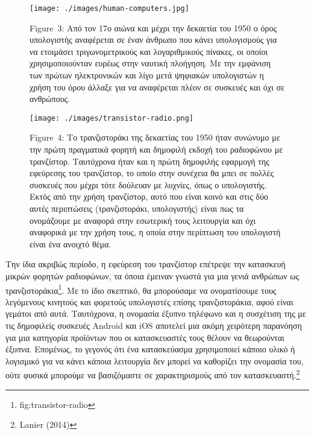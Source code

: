 \documentclass[
]{article}
\begin{document}
\leavevmode{}%
\begin{figure}
\hypertarget{fig:human-computers}{%
\centering
\texttt{[image: ./images/human-computers.jpg]}
\caption{Figure~3: Από τον 17ο αιώνα και μέχρι την δεκαετία του 1950 ο
όρος υπολογιστής αναφέρεται σε έναν άνθρωπο που κάνει υπολογισμούς για
να ετοιμάσει τριγωνομετρικούς και λογαριθμικούς πίνακες, οι οποίοι
χρησιμοποιούνταν ευρέως στην ναυτική πλοήγηση. Με την εμφάνιση των
πρώτων ηλεκτρονικών και λίγο μετά ψηφιακών υπολογιστών η χρήση του όρου
άλλαξε για να αναφέρεται πλέον σε συσκευές και όχι σε
ανθρώπους.}\label{fig:human-computers}
}
\end{figure}

\leavevmode{}%
\begin{figure}
\hypertarget{fig:transistor-radio}{%
\centering
\texttt{[image: ./images/transistor-radio.png]}
\caption{Figure~4: Το τρανζιστοράκι της δεκαετίας του 1950 ήταν συνώνυμο
με την πρώτη πραγματικά φορητή και δημοφιλή εκδοχή του ραδιοφώνου με
τρανζίστορ. Ταυτόχρονα ήταν και η πρώτη δημοφιλής εφαρμογή της εφεύρεσης
του τρανζίστορ, το οποίο στην συνέχεια θα μπει σε πολλές συσκευές που
μέχρι τότε δούλευαν με λυχνίες, όπως ο υπολογιστής. Εκτός από την χρήση
τρανζίστορ, αυτό που είναι κοινό και στις δύο αυτές περιπτώσεις
(τρανζιστοράκι, υπολογιστής) είναι πως τα ονομάζουμε με αναφορά στην
εσωτερική τους λειτουργία και όχι αναφορικά με την χρήση τους, η οποία
στην περίπτωση του υπολογιστή είναι ένα ανοιχτό
θέμα.}\label{fig:transistor-radio}
}
\end{figure}

Την ίδια ακριβώς περίοδο, η εφεύρεση του τρανζίστορ επέτρεψε την
κατασκευή μικρών φορητών ραδιοφώνων, τα όποια έμειναν γνωστά για μια
γενιά ανθρώπων ως τρανζιστοράκια\footnote{fig:transistor-radio}. Με το
ίδιο σκεπτικό, θα μπορούσαμε να ονοματίσουμε τους λεγόμενους κινητούς
και φορετούς υπολογιστές επίσης τρανζιστοράκια, αφού είναι γεμάτοι από
αυτά. Ταυτόχρονα, η ονομασία έξυπνο τηλέφωνο και η συσχέτιση της με τις
δημοφιλείς συσκευές Android και iOS αποτελεί μια ακόμη χειρότερη
παρανόηση για μια κατηγορία προϊόντων που οι κατασκευαστές τους θέλουν
να θεωρούνται έξυπνα. Επομένως, το γεγονός ότι ένα κατασκεύασμα
χρησιμοποιεί κάποιο υλικό ή λογισμικό για να κάνει κάποια λειτουργία δεν
μπορεί να καθορίζει την ονομασία του, ούτε φυσικά μπορούμε να
βασιζόμαστε σε χαρακτηρισμούς από τον κατασκευαστή.\footnote{Lanier
  (2014)}
\end{document}
